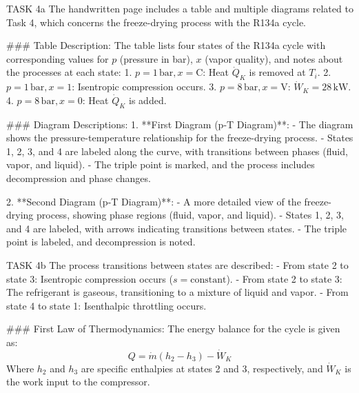 TASK 4a  
The handwritten page includes a table and multiple diagrams related to Task 4, which concerns the freeze-drying process with the R134a cycle.

### Table Description:
The table lists four states of the R134a cycle with corresponding values for \( p \) (pressure in bar), \( x \) (vapor quality), and notes about the processes at each state:
1. \( p = 1 \, \text{bar}, x = \text{C} \): Heat \( \dot{Q}_K \) is removed at \( T_i \).  
2. \( p = 1 \, \text{bar}, x = 1 \): Isentropic compression occurs.  
3. \( p = 8 \, \text{bar}, x = \text{V} \): \( \dot{W}_K = 28 \, \text{kW} \).  
4. \( p = 8 \, \text{bar}, x = 0 \): Heat \( \dot{Q}_K \) is added.

### Diagram Descriptions:
1. **First Diagram (p-T Diagram)**:
   - The diagram shows the pressure-temperature relationship for the freeze-drying process.  
   - States 1, 2, 3, and 4 are labeled along the curve, with transitions between phases (fluid, vapor, and liquid).  
   - The triple point is marked, and the process includes decompression and phase changes.

2. **Second Diagram (p-T Diagram)**:
   - A more detailed view of the freeze-drying process, showing phase regions (fluid, vapor, and liquid).  
   - States 1, 2, 3, and 4 are labeled, with arrows indicating transitions between states.  
   - The triple point is labeled, and decompression is noted.

TASK 4b  
The process transitions between states are described:
- From state 2 to state 3: Isentropic compression occurs (\( s = \text{constant} \)).  
- From state 2 to state 3: The refrigerant is gaseous, transitioning to a mixture of liquid and vapor.  
- From state 4 to state 1: Isenthalpic throttling occurs.

### First Law of Thermodynamics:
The energy balance for the cycle is given as:  
\[
Q = \dot{m}(h_2 - h_3) - \dot{W}_K
\]  
Where \( h_2 \) and \( h_3 \) are specific enthalpies at states 2 and 3, respectively, and \( \dot{W}_K \) is the work input to the compressor.